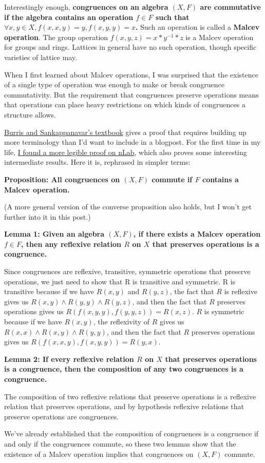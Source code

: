 \documentclass{article}
\begin{document}
Interestingly enough, \textbf{congruences on an algebra $(X, F)$ are commutative if the algebra contains an operation $f \in F$ such that $\forall x, y \in X, f(x, x, y) = y, f(x, y, y) = x$.} Such an operation is called a \textbf{Malcev operation}. The group operation $f(x, y, z) = x * y^{-1} * z$ is a Malcev operation for groups and rings. Lattices in general have no such operation, though specific varieties of lattice may.

When I first learned about Malcev operations, I was surprised that the existence of a single type of operation was enough to make or break congruence commutativity. But the requirement that congruences preserve operations means that operations can place heavy restrictions on which kinds of congruences a structure allows.

\href{http://www.math.uwaterloo.ca/~snburris/htdocs/UALG/univ-algebra2012.pdf}{Burris and Sankappanavar's textbook} gives a proof that requires building up more terminology than I'd want to include in a blogpost. For the first time in my life, \href{https://ncatlab.org/nlab/show/Malcev+variety}{I found a more legible proof on nLab}, which also proves some interesting intermediate results. Here it is, rephrased in simpler terms:

\textbf{Proposition: All congruences on $(X, F)$ commute if $F$ contains a Malcev operation.}

(A more general version of the converse proposition also holds, but I won't get further into it in this post.)

\textbf{Lemma 1: Given an algebra $(X, F)$, if there exists a Malcev operation $f \in F$, then any reflexive relation $R$ on $X$ that preserves operations is a congruence.}

Since congruences are reflexive, transitive, symmetric operations that preserve operations, we just need to show that R is transitive and symmetric. R is transitive because if we have $R(x, y)$ and $R(y, z)$, the fact that $R$ is reflexive gives us $R(x, y) \land R(y, y) \land R(y, z)$, and then the fact that $R$ preserves operations gives us $R(f(x, y, y), f(y, y, z)) = R(x, z)$. $R$ is symmetric because if we have $R(x, y)$, the reflexivity of $R$ gives us $R(x, x) \land R(x, y) \land R(y, y)$, and then the fact that $R$ preserves operations gives us $R(f(x, x, y), f(x, y, y)) = R(y, x)$.

\textbf{Lemma 2: If every reflexive relation $R$ on $X$ that preserves operations is a congruence, then the composition of any two congruences is a congruence.}

The composition of two reflexive relations that preserve operations is a reflexive relation that preserves operations, and by hypothesis reflexive relations that preserve operations are congruences.

We've already established that the composition of congruences is a congruence if and only if the congruences commute, so these two lemmas show that the existence of a Malcev operation implies that congruences on $(X, F)$ commute.
\end{document}
